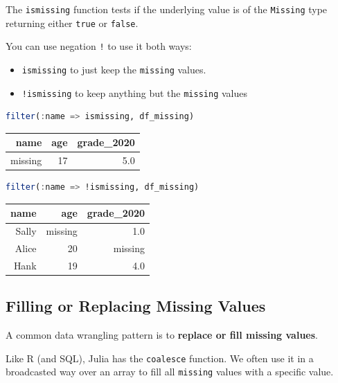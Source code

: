 \documentclass[
  notoc %
]{tufte-book}
\providecommand{\tightlist}{%
  \setlength{\itemsep}{0pt}\setlength{\parskip}{0pt}
}
\newcommand{\passthrough}[1]{#1}
\begin{document}
The \passthrough{\lstinline!ismissing!} function tests if the underlying
value is of the \passthrough{\lstinline!Missing!} type returning either
\passthrough{\lstinline!true!} or \passthrough{\lstinline!false!}.

You can use negation \passthrough{\lstinline"!"} to use it both ways:

\begin{itemize}
\tightlist
\item
  \passthrough{\lstinline!ismissing!} to just keep the
  \passthrough{\lstinline!missing!} values.
\item
  \passthrough{\lstinline"!ismissing"} to keep anything but the
  \passthrough{\lstinline!missing!} values
\end{itemize}

\begin{lstlisting}[language=Julia]
filter(:name => ismissing, df_missing)
\end{lstlisting}

\begin{longtable}[]{@{}rrr@{}}
\toprule()
name & age & grade\_2020 \\
\midrule()
\endhead
missing & 17 & 5.0 \\
\bottomrule()
\end{longtable}

\begin{lstlisting}[language=Julia]
filter(:name => !ismissing, df_missing)
\end{lstlisting}

\begin{longtable}[]{@{}rrr@{}}
\toprule()
name & age & grade\_2020 \\
\midrule()
\endhead
Sally & missing & 1.0 \\
Alice & 20 & missing \\
Hank & 19 & 4.0 \\
\bottomrule()
\end{longtable}

\hypertarget{sec:missing_filling}{%
\subsection{Filling or Replacing Missing
Values}\label{sec:missing_filling}}

A common data wrangling pattern is to \textbf{replace or fill missing
values}.

Like R (and SQL), Julia has the \passthrough{\lstinline!coalesce!}
function. We often use it in a broadcasted way over an array to fill all
\passthrough{\lstinline!missing!} values with a specific value.
\end{document}
